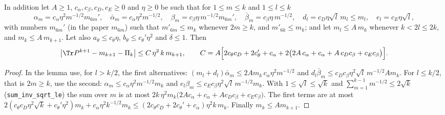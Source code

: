 \begin{corollary}\label{cor:reduction-abstract-closed}
In addition let $A\ge1$, $c_\alpha,c_\beta,c_D,c_E\ge0$ and $\eta\ge0$ be such that for $1\le m\le k$ and $1\le l\le k$
\[
 \alpha_m=c_\alpha\eta^2m^{-1/2}m_{6m}',\quad\bar\alpha_m=c_\alpha\eta^2m^{-1/2},\quad
 \beta_m=c_\beta\eta\,m^{-1/2}m_{6m}',\quad\bar\beta_m=c_\beta\eta\,m^{-1/2},\quad
 d_l=c_D\eta\sqrt l\,m_l\le m_l,\quad e_l=c_E\eta\sqrt l,
\]
with numbers $m_{6m}'$ (in the paper $m_{6m}$) such that $m'_{6m}\le m_k$ whenever $2m\ge k$, and
$m'_{6k}\le m_k$; and let $m_l\le A\,m_k$ whenever $k<2l\le2k$, and $m_k\le A\,m_{k+1}$. Let also
$a_\theta\le c_\theta\eta$, $b_\theta\le c_\theta'\eta^2$ and $\delta\le1$. Then
\[
 \big|\Tr P^{k+1}-m_{k+1}-\Pi_k\big|\le C\,\eta^2\,k\,m_{k+1},\qquad
 C=A\Big[2c_\theta c_D+2c_\theta'+c_\alpha+2\big(2A\,c_\alpha+c_\alpha+A\,c_Dc_\beta+c_Ec_\beta\big)\Big].
\]
\end{corollary}

\begin{proof}
In the lemma use, for $l>k/2$, the first alternatives: $(m_l+d_l)\bar\alpha_m\le2Am_k\,c_\alpha\eta^2m^{-1/2}$ and
$d_l\bar\beta_m\le c_Dc_\beta\eta^2\sqrt l\,m^{-1/2}Am_k$. For $l\le k/2$, that is $2m\ge k$, use the second:
$\alpha_m\le c_\alpha\eta^2m^{-1/2}m_k$ and $e_l\beta_m\le c_Ec_\beta\eta^2\sqrt l\,m^{-1/2}m_k$. With
$1\le\sqrt l\le\sqrt k$ and $\sum_{m=1}^{k-1}m^{-1/2}\le2\sqrt k$ (\texttt{sum\_inv\_sqrt\_le}) the sum over $m$ is at most
$2k\,\eta^2m_k\big(2Ac_\alpha+c_\alpha+Ac_Dc_\beta+c_Ec_\beta\big)$. The first terms are at most
$2(c_\theta c_D\eta^2\sqrt k+c_\theta'\eta^2)m_k+c_\alpha\eta^2k^{-1/2}m_k\le(2c_\theta c_D+2c_\theta'+c_\alpha)\eta^2k\,m_k$.
Finally $m_k\le Am_{k+1}$.
\end{proof}

